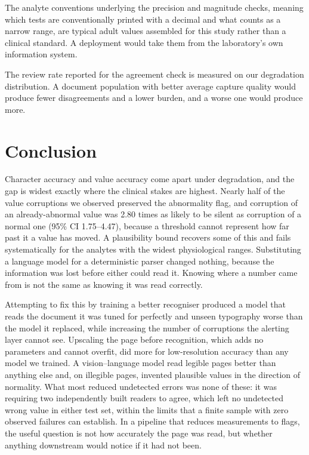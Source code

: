 \documentclass[11pt]{article}
\begin{document}
The analyte conventions underlying the precision and magnitude checks, meaning which tests are
conventionally printed with a decimal and what counts as a narrow range, are typical adult
values assembled for this study rather than a clinical standard. A deployment would take them
from the laboratory's own information system.

The review rate reported for the agreement check is measured on our degradation distribution. A
document population with better average capture quality would produce fewer disagreements and a
lower burden, and a worse one would produce more.

\section{Conclusion}

Character accuracy and value accuracy come apart under degradation, and the gap is widest
exactly where the clinical stakes are highest. Nearly half of the value corruptions we observed
preserved the abnormality flag, and corruption of an already-abnormal value was 2.80 times as
likely to be silent as corruption of a normal one (95\% CI 1.75--4.47), because a threshold
cannot represent how far past it a value has moved. A plausibility bound recovers some of this and fails
systematically for the analytes with the widest physiological ranges. Substituting a language
model for a deterministic parser changed nothing, because the information was lost before either
could read it. Knowing where a number came from is not the same as knowing it was read
correctly.

Attempting to fix this by training a better recogniser produced a model that reads the document
it was tuned for perfectly and unseen typography worse than the model it replaced, while
increasing the number of corruptions the alerting layer cannot see. Upscaling the page before
recognition, which adds no parameters and cannot overfit, did more for low-resolution accuracy
than any model we trained. A vision--language model read legible pages better than anything else
and, on illegible pages, invented plausible values in the direction of normality. What most reduced undetected errors was none of these: it was requiring two independently built readers to agree, which
left no undetected wrong value in either test set, within the limits that a finite sample with
zero observed failures can establish. In a pipeline that reduces measurements to
flags, the useful question is not how accurately the page was read, but whether anything
downstream would notice if it had not been.
\end{document}
